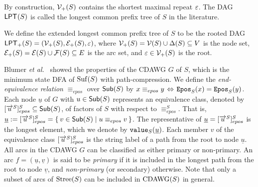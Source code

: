 \documentclass{article}
\begin{document}
By construction,
$\sig V_+(S)$ contains the shortest maximal repeat $\eps$. The DAG $\LPT(S)$ is called the longest common prefix tree of $S$ in the literature.  

\begin{definition}
  We define the extended longest common prefix tree of $S$ to be the rooted DAG $\LPT[+](S) = (\sig V_+(S), \sig E_+(S), \eps)$, where 
  $\sig V_+(S) = \sig V(S) \cup \Delta(S) \subseteq V$ is the node set, $\sig E_+(S) = \sig E(S) \cup \sig F(S) \subseteq E$ is the arc set, and $\eps \in \sig V_+(S)$ is the root. 
\end{definition}

Blumer \textit{et al.}~\cite{blumer1987complete} showed the properties of the CDAWG $G$ of $S$, which is the minimum state DFA of $\Suf(S)$ with path-compression. We define the \textit{end-equivalence relation} $\equiv_{epos}$ over $\Sub(S)$ by $x \equiv_{epos} y \iff\Epos(x) = \Epos(y)$.
Each node $\underline u$ of $G$ with $u \in \Sub(S)$ represents an equivalence class, denoted by $[\rext{u}]^S_{epos} \subseteq \Sub(S)$, of factors of $S$ with respect to $\equiv^S_{epos}$. That is, $\underline u := [\rext{u}]^S_{epos} = \sete{ v \in \Sub(S) \mid u \equiv_{epos} v}$.
The representative of $\underline u = [\rext{u}]^S_{epos}$ is the longest element, which we denote by $\Value(\underline u)$. 
Each member $v$ of the equivalence class $[\rext{u}]^S_{epos}$ is the string label of a path from the root to node $\underline u$. 
All arcs in the CDAWG $G$ can be classified as either primary or non-primary. An arc $f = (\underline u, \underline v)$ is said to be \textit{primary} if it is included in the longest path from the root to node $\underline v$, and \textit{non-primary} (or secondary) otherwise.
Note that only a subset of arcs of $\Stree(S)$ can be included in $\CDAWG(S)$ in general. 
\end{document}
